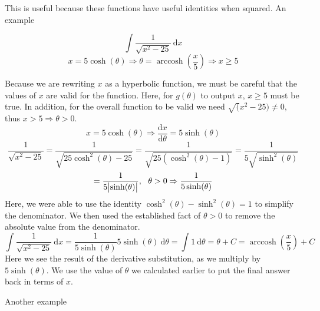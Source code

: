 \documentclass[12pt]{report}
\newcommand{\dx}{\:\mathrm{d}x}
\newcommand{\dd}[2]{\frac{\mathrm{d}#1}{\mathrm{d}#2}}
\DeclareMathOperator{\arccosh}{arccosh}
\begin{document}
\begin{flushleft}
This is useful because these functions have useful identities when squared. An
example

\[\int\frac{1}{\sqrt{x^2 - 25}}\dx\]
\[x = 5\cosh(\theta) \Rightarrow \theta = \arccosh\left(\frac{x}{5}\right)
\Rightarrow x \geq 5\]
\begin{center}
Because we are rewriting \(x\) as a hyperbolic function, we must be careful
that the values of \(x\) are valid for the function. Here, for 
\(g(\theta)\) to output \(x\), \(x\geq5\) must be true. In addition, for
the overall function to be valid we need \(\sqrt(x^2 - 25) \neq 0\), thus
\(x > 5 \Rightarrow \theta > 0\).
\[x = 5\cosh(\theta) \Rightarrow \dd{x}{\theta} = 5\sinh(\theta)\]
\[\frac{1}{\sqrt{x^2 - 25}} = \frac{1}{\sqrt{25\cosh^2(\theta) - 25}} =
\frac{1}{\sqrt{25(\cosh^2(\theta) - 1)}} = \frac{1}{5\sqrt{\sinh^2(\theta)}}\] 
\[= \frac{1}{5\abs{\sinh(\theta)}}, \:\:\: \theta > 0 \Rightarrow
\frac{1}{5\sinh(\theta)}\]
Here, we were able to use the identity 
\(\cosh^2(\theta) - \sinh^2(\theta) = 1\) to simplify the denominator. We
then used the established fact of \(\theta > 0\) to remove the absolute
value from the denominator.
\[\int\frac{1}{\sqrt{x^2 - 25}}\dx 
= \frac{1}{5\sinh(\theta)}5\sinh(\theta)\:\mathrm{d}\theta
= \int 1 \:\mathrm{d}\theta = \theta + C 
= \arccosh\left(\frac{x}{5}\right) + C\]
Here we see the result of the derivative substitution, as we multiply by
\(5\sinh(\theta)\). We use the value of \(\theta\) we calculated earlier to
put the final answer back in terms of \(x\).        
\end{center}

Another example


\end{flushleft}
\end{document}
